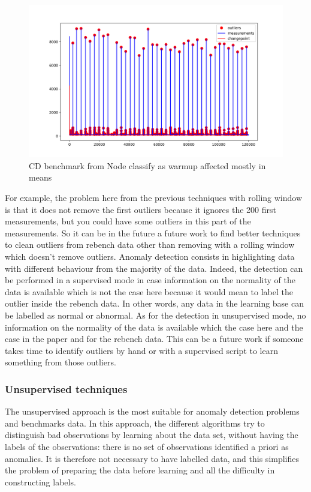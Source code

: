 \documentclass{article}
\begin{document}
\begin{figure}[h!]
    \centering
    \includegraphics[width=1\textwidth]{images/plot_13_flat.png}
    \caption{CD benchmark from Node classify as warmup affected mostly in means}
    \label{fig:bench_node_flat}
\end{figure}

For example, the problem here from the previous techniques with rolling window is that it does not remove the first outliers because it ignores the 200 first measurements, but you could have some outliers in this part of the measurements. So it can be in the future a future work to find better techniques to clean outliers from rebench data other than removing with a rolling window which doesn't remove outliers.
Anomaly detection consists in highlighting data with different behaviour from the majority of the data. 
Indeed, the detection can be performed in a supervised mode in case information on the normality of the data is available which is not the case here because it would mean to label the outlier inside the rebench data. In other words, any data in the learning base can be labelled as normal or abnormal.
As for the detection in unsupervised mode, no information on the normality of the data is available which the case here and the case in the \citep{barrett2017virtual} paper and for the rebench data. This can be a future work if someone takes time to identify outliers by hand or with a supervised script to learn something from those outliers.

\subsubsection{Unsupervised techniques}
The unsupervised approach is the most suitable for anomaly detection problems and benchmarks data. In this approach, the different algorithms try to distinguish bad observations by learning about the data set, without having the labels of the observations: there is no set of observations identified a priori as anomalies. It is therefore not necessary to have labelled data, and this simplifies the problem of preparing the data before learning and all the difficulty in constructing labels.
\end{document}

